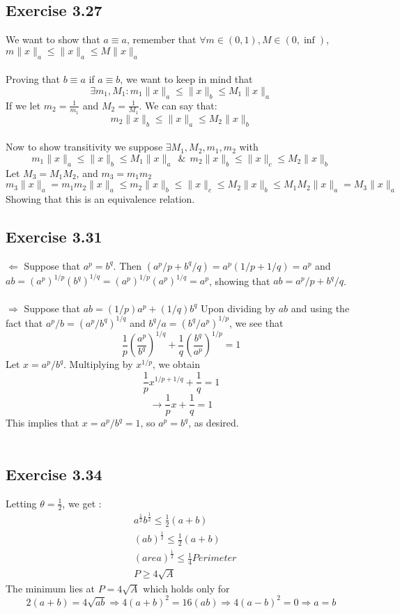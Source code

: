 \documentclass[letterpaper,12pt]{article}
\theoremstyle{definition}
\begin{document}
\subsection*{Exercise 3.27}
We want to show that $a\equiv a$, remember that $\forall m \in (0,1), M \in (0, \inf)$, $m\|x\|_a \leq \|x\|_a \leq M \|x\| _a$\\
\smallskip\\ 
Proving that $ b \equiv a$ if $a \equiv b$, we want to keep in mind that 
\[\exists m_1,M_1: m_1\|x\|_a \leq \|x\|_b \leq M_1\|x\|_a \]
If we let $m_2 = \frac{1}{m_1}$ and $ M_2 = \frac{1}{M_1}$. We can say that:\\
\[m_2\|x\|_b \leq \|x\|_a \leq M_2\|x\|_b \]
\smallskip\\
Now to show transitivity we suppose $\exists M_1,M_2,m_1,m_2$ with \\
\[m_1\|x\|_a \leq \|x\|_b \leq M_1 \|x\|_a ~~\&~~
 m_2\|x\|_b \leq \|x\|_c \leq M_2 \|x\|_b \] 
Let $M_3 = M_1 M_2$, and $m_3 = m_1 m_2$\\
\[m_3 \|x \|_a = m_1m_2\|x\|_a \leq m_2 \|x\|_b \leq \|x\|_c \leq M_2 \|x\|_b \leq M_1M_2 \|x\|_a = M_3 \|x\|_a\]
Showing that this is an equivalence relation.

\subsection*{Exercise 3.31}
$\Leftarrow$ Suppose that $a^{p} = b^{q}$. Then $(a^{p}/p+b^{q}/q)=a^{p}(1/p+1/q)=a^{p}$ and $ab = (a^{p})^{1/p}(b^{q})^{1/q}=(a^{p})^{1/p}(a^{p})^{1/q}=a^{p}$, showing that $ab = a^{p}/p+b^{q}/q$. \\ \\
$\Rightarrow$ Suppose that $ab=(1/p)a^{p}+(1/q)b^{q}$ Upon dividing by $ab$ and using the fact that $a^{p}/b=(a^{p}/b^{q})^{1/q}$ and $b^{q}/a=(b^{q}/a^{p})^{1/p}$, we see that \[ \frac{1}{p}(\frac{a^{p}}{b^{q}})^{1/q}+\frac{1}{q}(\frac{b^{q}}{a^{p}})^{1/p}=1\]
Let $x= a^{p}/b^{q}$. Multiplying by $x^{1/p}$, we obtain 
\[ \frac{1}{p}x^{1/p+1/q}+\frac{1}{q}=1\]
 \[\rightarrow \frac{1}{p}x+\frac{1}{q}=1\]
 This implies that $x= a^{p}/b^{q}=1$, so $a^{p}= b^{q}$, as desired.\\\\

\subsection*{Exercise 3.34}
Letting $\theta=\frac{1}{2}$, we get : 
\begin{align*}
&a^\frac{1}{2}b^\frac{1}{2} \leq \frac{1}{2} (a+b) \\
&(ab)^\frac{1}{2} \leq \frac{1}{2} (a+b) \\
&(area)^\frac{1}{2} \leq \frac{1}{4} Perimeter \\
& P \geq 4 \sqrt{A}
\end{align*}
The minimum lies at $P=4 \sqrt{A}$ which holds only for 
\[2(a+b)=4\sqrt{ab} \Rightarrow 4(a+b)^2 = 16(ab) \Rightarrow 4(a-b)^2=0 \Rightarrow a=b \]
\end{document}
